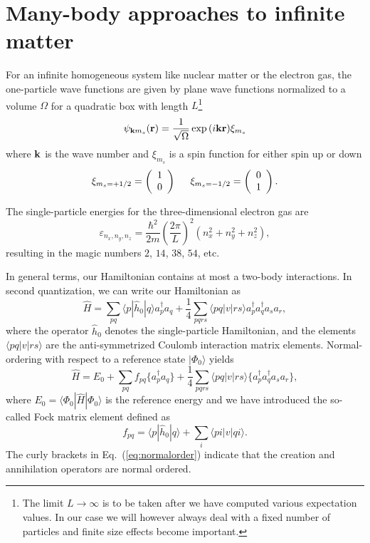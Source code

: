 \documentclass[aps,prc,twocolumn,showpacs,floatfix,nofootinbib,preprintnumbers,superscriptaddress,amsmath,amssymb]{revtex4-1}
\begin{document}
\section*{Many-body approaches to infinite matter}
For an infinite homogeneous system  like nuclear matter or the electron gas, 
the one-particle wave functions are given by plane wave functions
normalized to a volume $\Omega$ for a quadratic box with length
$L$\footnote{The limit $L\rightarrow \infty$ is to be taken after we
  have computed various expectation values. In our case we will
  however always deal with a fixed number of particles and finite size
  effects become important. }
\[
\psi_{{\bf k}m_s}({\bf r})= \frac{1}{\sqrt{\Omega}}\exp{(i{\bf kr})}\xi_{m_s}
\]
where ${\bf k}$ is the wave number and $\xi_{m_s}$ is a spin function
for either spin up or down
\[ 
\xi_{m_{s}=+1/2}=\left(\begin{array}{c} 1
  \\ 0 \end{array}\right) \hspace{0.5cm}
\xi_{m_{s}=-1/2}=\left(\begin{array}{c} 0 \\ 1 \end{array}\right).\]

The single-particle energies for the three-dimensional electron gas
are
\[    
\varepsilon_{n_{x}, n_{y}, n_{z}} = \frac{\hbar^{2}}{2m}\left( \frac{2\pi }{L}\right)^{2}(n_{x}^{2}+n_{y}^{2}+n_{z}^{2}),
\]
resulting in the magic numbers $2$, $14$, $38$, $54$, etc.  

In general terms, our Hamiltonian contains at most a two-body
interactions. In second quantization, we can write our Hamiltonian as
\begin{equation}
\hat{H}= \sum_{pq}\langle p | \hat{h}_0 | q \rangle a_p^{\dagger} a_q + \frac{1}{4}\sum_{pqrs}\langle pq |v| r s \rangle a_p^{\dagger} a_q^{\dagger} a_s a_r,
\label{eq:ourHamiltonian}
\end{equation} 
where the operator $\hat{h}_0$ denotes the single-particle
Hamiltonian, and the elements $\langle pq|v|rs\rangle$ are the
anti-symmetrized Coulomb interaction matrix elements.  Normal-ordering
with respect to a reference state $|\Phi_0\rangle$ yields
\begin{equation}
\hat{H}=E_0 + \sum_{pq}f_{pq}\lbrace a_p^{\dagger} a_q\rbrace + \frac{1}{4}\sum_{pqrs}\langle pq |v| r s \rangle \lbrace a_p^{\dagger} a_q^{\dagger} a_s a_r \rbrace,
\label{eq:normalorder}
\end{equation}
where $E_0=\langle\Phi_0| \hat{H}| \Phi_0\rangle$ is the reference energy
and we have introduced the so-called  Fock matrix element defined as
\begin{equation}
f_{pq} = \langle p|\hat{h}_0| q \rangle + \sum\limits_{i} \langle pi |v| qi\rangle.
\label{eq:fockelement}
\end{equation}
The curly brackets in Eq.~(\ref{eq:normalorder}) indicate that the
creation and annihilation operators are normal ordered.
\end{document}
